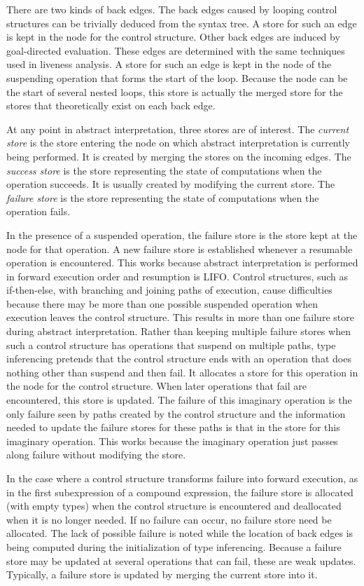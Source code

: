 There are two kinds of back edges. The back edges caused by looping
control structures can be trivially deduced from the syntax tree. A
store for such an edge is kept in the node for the control
structure. Other back edges are induced by goal-directed
evaluation. These edges are determined with the same techniques used
in liveness analysis. A store for such an edge is kept in the node of
the suspending operation that forms the start of the loop. Because the
node can be the start of several nested loops, this store is actually
the merged store for the stores that theoretically exist on each back
edge.

At any point in abstract interpretation, three stores are of
interest. The \textit{current store} is the store entering the node on
which abstract interpretation is currently being performed. It is
created by merging the stores on the incoming edges. The
\textit{success store} is the store representing the state of
computations when the operation succeeds. It is usually created by
modifying the current store. The \textit{failure store} is the store
representing the state of computations when the operation fails.

In the presence of a suspended operation, the failure store is the
store kept at the node for that operation. A new failure store is
established whenever a resumable operation is encountered. This works
because abstract interpretation is performed in forward execution
order and resumption is LIFO. Control structures, such as
if-then-else, with branching and joining paths of execution, cause
difficulties because there may be more than one possible suspended
operation when execution leaves the control structure. This results in
more than one failure store during abstract interpretation. Rather
than keeping multiple failure stores when such a control structure has
operations that suspend on multiple paths, type inferencing pretends
that the control structure ends with an operation that does nothing
other than suspend and then fail. It allocates a store for this
operation in the node for the control structure. When later operations
that fail are encountered, this store is updated. The failure of this
imaginary operation is the only failure seen by paths created by the
control structure and the information needed to update the failure
stores for these paths is that in the store for this imaginary
operation. This works because the imaginary operation just passes
along failure without modifying the store.


In the case where a control structure transforms failure into forward
execution, as in the first subexpression of a compound expression, the
failure store is allocated (with empty types) when the control
structure is encountered and deallocated when it is no longer
needed. If no failure can occur, no failure store need be
allocated. The lack of possible failure is noted while the location of
back edges is being computed during the initialization of type
inferencing. Because a failure store may be updated at several
operations that can fail, these are weak updates.  Typically, a
failure store is updated by merging the current store into it.

